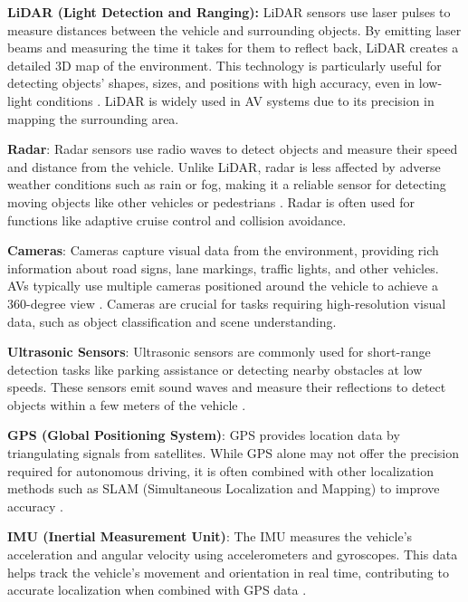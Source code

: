 \textbf{LiDAR (Light Detection and Ranging):}
    LiDAR sensors use laser pulses to measure distances between the vehicle and surrounding objects.
    By emitting laser beams and measuring the time it takes for them to reflect back, LiDAR creates
    a detailed 3D map of the environment. This technology is particularly useful for detecting objects'
    shapes, sizes, and positions with high accuracy, even in low-light conditions \cite{levinson2011towards}.
    LiDAR is widely used in \ac{AV} systems due to its precision in mapping the surrounding area.

\textbf{Radar}:
    Radar sensors use radio waves to detect objects and measure their speed and distance from the vehicle.
    Unlike LiDAR, radar is less affected by adverse weather conditions such as rain or fog, making it a
    reliable sensor for detecting moving objects like other vehicles or pedestrians \cite{patole2017automotive}.
    Radar is often used for functions like adaptive cruise control and collision avoidance.

    \textbf{Cameras}:
    Cameras capture visual data from the environment, providing rich information about road signs,
    lane markings, traffic lights, and other vehicles. \acp{AV} typically use multiple cameras positioned
    around the vehicle to achieve a 360-degree view \cite{geiger2012we}. Cameras are crucial for tasks requiring
    high-resolution visual data, such as object classification and scene understanding.

    \textbf{Ultrasonic Sensors}:
    Ultrasonic sensors are commonly used for short-range detection tasks like parking assistance or detecting nearby
    obstacles at low speeds. These sensors emit sound waves and measure their reflections to detect objects within
    a few meters of the vehicle \cite{zhang2018ultrasonic}.

    \textbf{GPS (Global Positioning System)}:
    GPS provides location data by triangulating signals from satellites. While GPS alone may not offer the precision
    required for autonomous driving, it is often combined with other localization methods such as SLAM
    (Simultaneous Localization and Mapping) to improve accuracy \cite{thrun2005slam}.

    \textbf{IMU (Inertial Measurement Unit)}:
    The IMU measures the vehicle's acceleration and angular velocity using accelerometers and gyroscopes.
    This data helps track the vehicle's movement and orientation in real time, contributing to accurate
    localization when combined with GPS data \cite{madgwick2011imu}.


